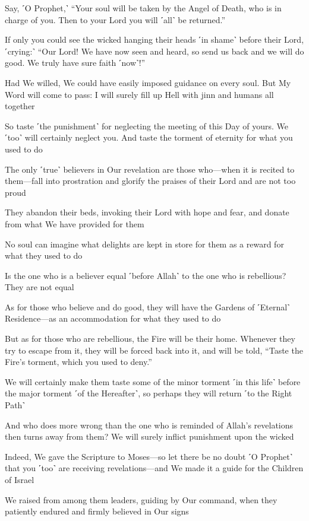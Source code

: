 Say, ˹O Prophet,˺ “Your soul will be taken by the Angel of Death, who is in charge of you. Then to your Lord you will ˹all˺ be returned.”

If only you could see the wicked hanging their heads ˹in shame˺ before their Lord, ˹crying:˺ “Our Lord! We have now seen and heard, so send us back and we will do good. We truly have sure faith ˹now˺!”

Had We willed, We could have easily imposed guidance on every soul. But My Word will come to pass: I will surely fill up Hell with jinn and humans all together

So taste ˹the punishment˺ for neglecting the meeting of this Day of yours. We ˹too˺ will certainly neglect you. And taste the torment of eternity for what you used to do

The only ˹true˺ believers in Our revelation are those who—when it is recited to them—fall into prostration and glorify the praises of their Lord and are not too proud

They abandon their beds, invoking their Lord with hope and fear, and donate from what We have provided for them

No soul can imagine what delights are kept in store for them as a reward for what they used to do

Is the one who is a believer equal ˹before Allah˺ to the one who is rebellious? They are not equal

As for those who believe and do good, they will have the Gardens of ˹Eternal˺ Residence—as an accommodation for what they used to do

But as for those who are rebellious, the Fire will be their home. Whenever they try to escape from it, they will be forced back into it, and will be told, “Taste the Fire’s torment, which you used to deny.”

We will certainly make them taste some of the minor torment ˹in this life˺ before the major torment ˹of the Hereafter˺, so perhaps they will return ˹to the Right Path˺

And who does more wrong than the one who is reminded of Allah’s revelations then turns away from them? We will surely inflict punishment upon the wicked

Indeed, We gave the Scripture to Moses—so let there be no doubt ˹O Prophet˺ that you ˹too˺ are receiving revelations—and We made it a guide for the Children of Israel

We raised from among them leaders, guiding by Our command, when they patiently endured and firmly believed in Our signs

